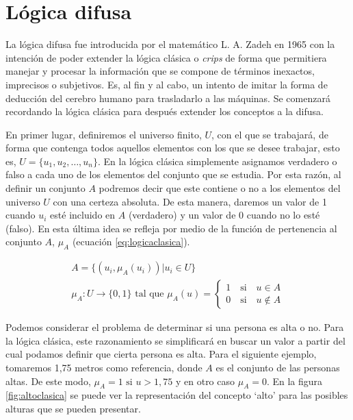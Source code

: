 \documentclass[main]{subfiles}
\begin{document}
\section{Lógica difusa}\label{sec:logicadifusa}
La lógica difusa fue introducida por el matemático L. A. Zadeh \cite{art:zadeh} en 1965 con la intención de poder extender la lógica clásica o {\em crips} de forma que permitiera manejar y procesar la información que se compone de términos inexactos, imprecisos o subjetivos. Es, al fin y al cabo, un intento de imitar la forma de deducción del cerebro humano para trasladarlo a las máquinas. Se comenzará recordando la lógica clásica para después extender los conceptos a la difusa.

En primer lugar, definiremos el universo finito, $U$,  con el que se  trabajará, de forma que contenga todos aquellos elementos con los que se desee trabajar, esto es, ${U = \{u_{1}, u_{2}, \dots, u_{n}\}}$. En la lógica clásica simplemente asignamos verdadero o falso a cada uno de los elementos del conjunto que se estudia. Por esta razón, al definir un conjunto $A$ podremos decir que este contiene o no a los elementos del universo $U$ con una certeza absoluta. De esta manera, daremos un valor de 1 cuando ${u_{i}}$ esté incluido en $A$ (verdadero) y un valor de 0 cuando no lo esté (falso). En esta última idea se refleja por medio de la función de pertenencia al conjunto  $A$, $\mu_{A}$ (ecuación \ref{eq:logicaclasica}).

\begin{gather}\label{eq:logicaclasica} %
	A = \{(u_{i}, \mu_{A}(u_{i})) | u_{i}\in U\}\\
	\mu_{A}:U\rightarrow \{0,1\} \text{ tal que }
	\mu_{A}(u) = \left\{
		\begin{aligned}
			1 \quad\text{si}\quad u\in A\\
			0 \quad\text{si}\quad u\notin A
		\end{aligned}
	\right.
\end{gather}

Podemos considerar el problema de determinar si una persona es alta o no. Para la lógica clásica, este razonamiento se simplificará en buscar un valor a partir del cual podamos definir que cierta persona es alta. Para el siguiente ejemplo, tomaremos 1,75 metros como referencia, donde $A$ es el conjunto de las personas altas. De este modo, ${\mu_{A}=1 \text{ si } u>1,75}$ y en otro caso ${\mu_{A}=0}$. En la figura \ref{fig:altoclasica} se puede ver la representación del concepto `alto' para las posibles alturas que se pueden presentar.
\end{document}
